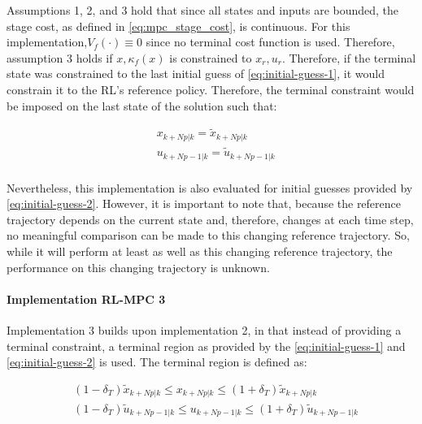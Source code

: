 Assumptions 1, 2, and 3 hold that since all states and inputs are bounded, the stage cost, as defined in \autoref{eq:mpc_stage_cost}, is continuous. For this implementation,$V_f(\cdot) \equiv 0$ since no terminal cost function is used. Therefore, assumption 3 holds if $x,\kappa_f(x)$ is constrained to $x_r,u_r$. Therefore, if the terminal state was constrained to the last initial guess of \autoref{eq:initial-guess-1}, it would constrain it to the RL’s reference policy. Therefore, the terminal constraint would be imposed on the last state of the solution such that:

\begin{equation}\label{eq:terminal-constraint-ocp}
\begin{aligned}
	&x_{k+Np|k} = \tilde{x}_{k+Np|k}\\ 
	&u_{k+Np-1|k} = \tilde{u}_{k+Np-1|k}\\
\end{aligned}
\end{equation}

Nevertheless, this implementation is also evaluated for initial guesses provided by \autoref{eq:initial-guess-2}. However, it is important to note that, because the reference trajectory depends on the current state and, therefore, changes at each time step, no meaningful comparison can be made to this changing reference trajectory. So, while it will perform at least as well as this changing reference trajectory, the performance on this changing trajectory is unknown.

\paragraph{Implementation RL-MPC 3}
Implementation 3 builds upon implementation 2, in that instead of providing a terminal constraint, a terminal region as provided by the \autoref{eq:initial-guess-1} and \autoref{eq:initial-guess-2} is used. The terminal region is defined as:

\begin{equation}\label{eq:terminal-region}
	\begin{aligned}
		& (1-\delta_T)\tilde{x}_{k+Np|k} \leq x_{k+Np|k} \leq (1+\delta_T)\tilde{x}_{k+Np|k}\\
		&(1-\delta_T)\tilde{u}_{k+Np-1|k} \leq u_{k+Np-1|k} \leq (1+\delta_T) \tilde{u}_{k+Np-1|k}\\
	\end{aligned}
\end{equation}

